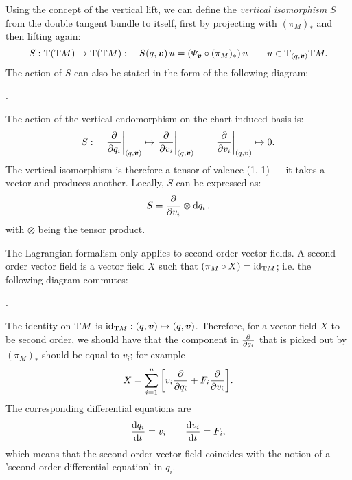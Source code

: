 Using the concept of the vertical lift, we can define the \emph{vertical isomorphism} $S$ from the double tangent bundle to itself, first by projecting with $(\pi_M)_*$ and then lifting again:
$$ S: \tbundle{\qty(\tbundle{M})} \to \tbundle{\qty(\tbundle{M})}: \quad S(q, \vec{v})\,u = \qty(\Psi_{\vec{v}} \circ (\pi_M)_*)\,u \qquad u \in \tspace{(q, \vec{v})}{\tbundle{M}}.  $$
The action of $S$ can also be stated in the form of the following diagram:
\begin{center}
   .
\end{center}
The action of the vertical endomorphism on the chart-induced basis is:
$$ S: \quad \left. \pdv{}{q_i}\right|_{(q, \vec{v})} \mapsto \left.\pdv{}{v_i}\right|_{(q, \vec{v})} \qquad  \left. \pdv{}{v_i}\right|_{(q, \vec{v})} \mapsto 0. $$
The vertical isomorphism is therefore a tensor of valence (1, 1) --- it takes a vector and produces another. Locally, $S$ can be expressed as:
$$ S = \pdv{}{v_i}\otimes \dd{q_i}. $$
with $\otimes$ being the tensor product. \cite{Carinena1990}

The Lagrangian formalism only applies to second-order vector fields. A second-order vector field is a vector field $X$ such that $(\pi_M \circ X) = \mathrm{id}_{\mathrm{T}M}$; i.e. the following diagram commutes: \cite{Abraham1978}
\begin{center}
   .
\end{center}
The identity on $\mathrm{T}M$ is $\mathrm{id}_{\tbundle{M}}: (q, \vec{v}) \mapsto (q, \vec{v})$. Therefore, for a vector field $X$ to be second order, we should have that the component in $\pdv{}{q_i}$ that is picked out by $(\pi_M)_*$ should be equal to $v_i$; for example
$$ X = \sum_{i=1}^n \qty[v_i \pdv{q_i} + F_i\pdv{v_i}]. $$
The corresponding differential equations are
$$ \dv{q_i}{t} = v_i \qquad \dv{v_i}{t} = F_i, $$
which means that the second-order vector field coincides with the notion of a 'second-order differential equation' in $q_i$.


